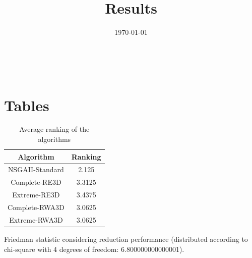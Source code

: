 \documentclass{article}
\title{Results}
\author{}
\date{\today}
\begin{document}
\oddsidemargin 0in \topmargin 0in\maketitle
\
\section{Tables}
\begin{table}[!htp]
\centering
\caption{Average ranking of the algorithms}
\begin{tabular}{c|c}
Algorithm&Ranking\\
\hline
NSGAII-Standard&2.125\\
Complete-RE3D&3.3125\\
Extreme-RE3D&3.4375\\
Complete-RWA3D&3.0625\\
Extreme-RWA3D&3.0625\\
\end{tabular}
\end{table}


Friedman statistic considering reduction performance (distributed according to chi-square with 4 degrees of freedom: 6.800000000000001).
\end{document}

